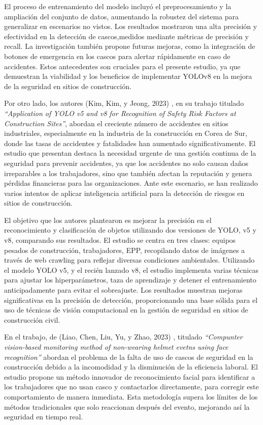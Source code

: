 \noindent
El proceso de entrenamiento del modelo incluyó el preprocesamiento y la ampliación del conjunto de datos, aumentando la robustez del sistema para generalizar en escenarios no vistos. Los resultados mostraron una alta precisión y efectividad en la detección de cascos,medidos mediante métricas de precisión y recall. La investigación también propone futuras mejoras, como la integración de botones de emergencia en los cascos para alertar rápidamente en caso de accidentes. Estos antecedentes son cruciales para el presente estudio, ya que demuestran la viabilidad y los beneficios de implementar YOLOv8 en la mejora de la seguridad en sitios de construcción.

Por otro lado, los autores (Kim, Kim, y Jeong, 2023) \cite{kim2023application}, en su trabajo titulado \textit{``Application of YOLO v5 and v8 for Recognition of Safety Risk Factors at Construction Sites''}, abordan el creciente número de accidentes en sitios industriales, especialmente en la industria de la construcción en Corea de Sur, donde las tasas de accidentes y fatalidades han aumentado significativamente. El estudio que presentan destaca la necesidad urgente de una gestión continua de la seguridad para prevenir accidentes, ya que los accidentes no solo causan daños irreparables a los trabajadores, sino que también afectan la reputación y genera pérdidas financieras para las organizaciones. Ante este escenario, se han realizado varios intentos de aplicar inteligencia artificial para la detección de riesgos en sitios de construcción.

\noindent
El objetivo que los autores plantearon es mejorar la precisión en el reconocimiento y clasificación de objetos utilizando dos versiones de YOLO, v5 y v8, comparando sus resultados. El estudio se centra en tres clases: equipos pesados de construcción, trabajadores, EPP, recopilando datos de imágenes a través de web crawling para reflejar diversas condiciones ambientales. Utilizando el modelo YOLO v5, y el recién lanzado v8, el estudio implementa varias técnicas para ajustar los hiperparámetros, taza de aprendizaje y detener el entrenamiento anticipadamente para evitar el sobreajuste. Los resultados muestran mejoras significativas en la precisión de detección, proporcionando una base sólida para el uso de técnicas de visión computacional en la gestión de seguridad en sitios de construcción civil.

En el trabajo, de (Liao, Chen, Liu, Yu, y Zhao, 2023) \cite{liao2023computer}, titulado \textit{``Compunter vision-based monitoring method of non-wearing helmet evetns using face recognition''} abordan el problema de la falta de uso de cascos de seguridad en la construcción debido a la incomodidad y la disminución de la eficiencia laboral. El estudio propone un método innovador de reconocimiento facial para identificar a los trabajadores que no usan casco y contactarlos directamente, para corregir este comportamiento de manera inmediata. Esta metodología supera los límites de los métodos tradicionales que solo reaccionan después del evento, mejorando así la seguridad en tiempo real.

